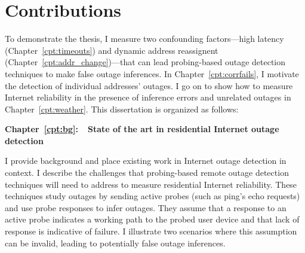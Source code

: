 

\section{Contributions}

To demonstrate the thesis, I measure two confounding factors---high
latency (Chapter~\ref{cpt:timeouts}) and dynamic address reassignent
(Chapter~\ref{cpt:addr_change})---that can lead probing-based outage
detection techniques to make false outage inferences. In
Chapter~\ref{cpt:corrfails}, I motivate the detection of individual
addresses' outages. I go on to show how
to measure Internet reliability in the presence of inference errors
and unrelated outages in Chapter~\ref{cpt:weather}. This dissertation is organized as follows:



\textbf{Chapter~\ref{cpt:bg}:~~State of the art in residential Internet outage detection}

I provide background and place existing work in Internet outage
detection in context. I describe the challenges that probing-based
remote outage detection techniques will need to address to measure
residential Internet reliability. These techniques study outages by
sending active probes (such as ping's echo requests) and use probe
responses to infer outages. They assume that a response to an active
probe indicates a working path to the probed user device and that lack
of response is indicative of failure. I illustrate two scenarios where
this assumption can be invalid, leading to potentially false outage
inferences. 

